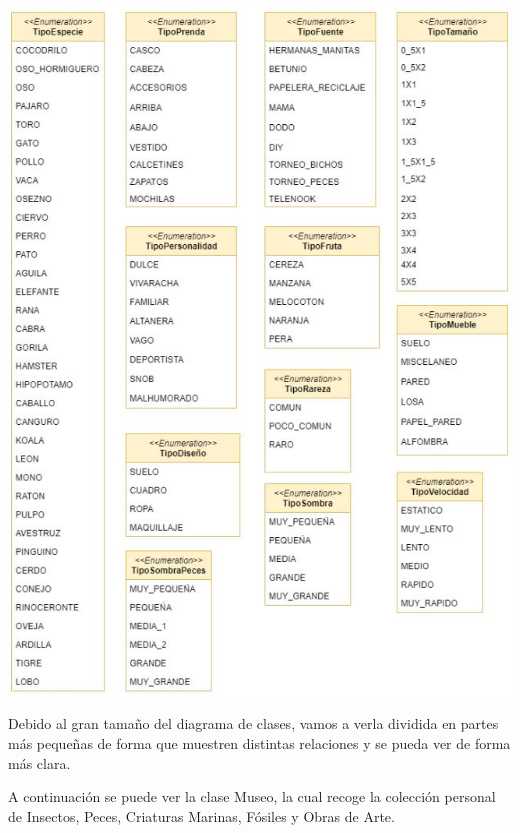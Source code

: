 	\bigskip
	
	\includegraphics[width=\textwidth]{img/cap5/diagramaclases/enums.jpg}
	
	\bigskip
	
	Debido al gran tamaño del diagrama de clases, vamos a verla dividida en partes más pequeñas de forma que muestren distintas relaciones y se pueda ver de forma más clara.
	
	\bigskip
	
	A continuación se puede ver la clase Museo, la cual recoge la colección personal de Insectos, Peces, Criaturas Marinas, Fósiles y Obras de Arte.
	
	\bigskip
	
